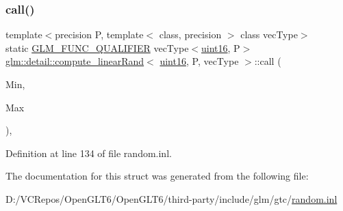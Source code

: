 \subsubsection{\texorpdfstring{call()}{call()}}
{\footnotesize\ttfamily template$<$precision P, template$<$ class, precision $>$ class vec\+Type$>$ \\
static \mbox{\hyperlink{setup_8hpp_a33fdea6f91c5f834105f7415e2a64407}{G\+L\+M\+\_\+\+F\+U\+N\+C\+\_\+\+Q\+U\+A\+L\+I\+F\+I\+ER}} vec\+Type$<$\mbox{\hyperlink{namespaceglm_1_1detail_a47b2a7d006d187338e8031a352d1ce56}{uint16}}, P$>$ \mbox{\hyperlink{structglm_1_1detail_1_1compute__linear_rand}{glm\+::detail\+::compute\+\_\+linear\+Rand}}$<$ \mbox{\hyperlink{namespaceglm_1_1detail_a47b2a7d006d187338e8031a352d1ce56}{uint16}}, P, vec\+Type $>$\+::call (\begin{DoxyParamCaption}\item[{vec\+Type$<$ \mbox{\hyperlink{namespaceglm_1_1detail_a47b2a7d006d187338e8031a352d1ce56}{uint16}}, P $>$ const \&}]{Min,  }\item[{vec\+Type$<$ \mbox{\hyperlink{namespaceglm_1_1detail_a47b2a7d006d187338e8031a352d1ce56}{uint16}}, P $>$ const \&}]{Max }\end{DoxyParamCaption})\hspace{0.3cm}{\ttfamily [inline]}, {\ttfamily [static]}}



Definition at line 134 of file random.\+inl.



The documentation for this struct was generated from the following file\+:\begin{DoxyCompactItemize}
\item 
D\+:/\+V\+C\+Repos/\+Open\+G\+L\+T6/\+Open\+G\+L\+T6/third-\/party/include/glm/gtc/\mbox{\hyperlink{random_8inl}{random.\+inl}}\end{DoxyCompactItemize}

